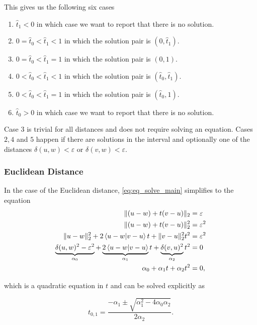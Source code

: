 This gives us the following six cases 
\begin{enumerate}
  \item \(\hat t_1 < 0\) in which case we want to report that there is no solution.
  \item \(0 = \hat t_0 < \hat t_1 < 1\) in which the solution pair is \((0, \hat t_1)\).
  \item \(0 = \hat t_0 < \hat t_1 = 1\) in which the solution pair is \((0, 1)\).
  \item \(0 < \hat t_0 < \hat t_1 < 1\) in which the solution pair is \((\hat t_0, \hat t_1)\).
  \item \(0 < \hat t_0 < \hat t_1 = 1\) in which the solution pair is \((\hat t_0, 1)\).
  \item \(\hat t_0 > 0\) in which case we want to report that there is no solution.
\end{enumerate}

Case \(3\) is trivial for all distances and does not require solving an equation. Cases \(2, 4\) and \(5\) happen if there are solutions in the interval and optionally one of the distances \(\delta(u,w) < \varepsilon\) or \(\delta(v,w) < \varepsilon\).


\subsubsection{Euclidean Distance}
\label{subsubsec:eq_euclidean_distance}
In the case of the Euclidean distance, \cref{eq:eq_solve_main} simplifies to the equation 
\begin{align*}
  \| (u - w) + t(v - u) \|_2 &= \varepsilon \\
  \| (u - w) + t(v - u) \|_2^2 &= \varepsilon^2 \\
  \| u - w \|_2^2 + 2\braket{u - w | v - u} t  +  \| v - u \|_2^2 t^2 &= \varepsilon^2 \\
  \underbrace{\delta(u,w)^2 - \varepsilon^2}_{\alpha_0} + \underbrace{2\braket{u - w | v - u} }_{\alpha_1}t  +  \underbrace{\delta(v, u)^2}_{\alpha_2} t^2 &= 0 \\
  \alpha_0 + \alpha_1 t  + \alpha_2 t^2 &= 0,
\end{align*}

which is a quadratic equation in \(t\) and can be solved explicitly as 

\begin{equation}
  t_{0,1} = \frac{-\alpha_1 \pm \sqrt{\alpha_1^2 - 4\alpha_0\alpha_2}}{2\alpha_2}.\label{eq:sol_explicit_euclidean}
\end{equation}

